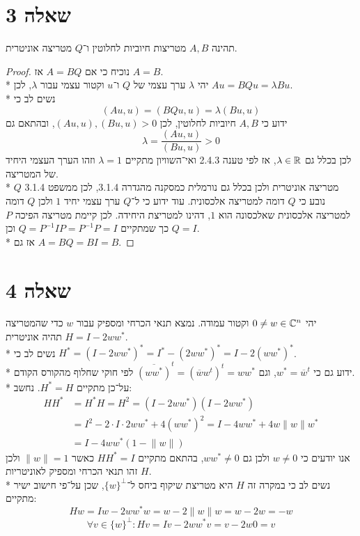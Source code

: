 \section{שאלה 3}
תהינה $A, B$ מטריצות חיוביות לחלוטין ו־$Q$ מטריצה אוניטרית.
\begin{proof}
	נוכיח כי אם $A = BQ$ אז $A = B$. \\*
	יהי $\lambda$ ערך עצמי של $Q$ ו־$u$ וקטור עצמי עבור $\lambda$, לכן $A u = B Q u = \lambda B u$. \\*
	נשים לב כי
	\[
		(A u, u) = (B Q u, u) = \lambda (B u, u)
	\]
	ידוע כי $A, B$ חיוביות לחלוטין, לכן $(Au, u), (Bu, u) > 0$, ובהתאם גם
	\[
		\lambda = \frac{(A u, u)}{(B u, u)} > 0
	\]
	לכן בכלל גם $\lambda \in \mathbb{R}$, אז לפי טענה 2.4.3 ואי־השוויון מתקיים $\lambda = 1$ וזהו הערך העצמי היחיד של המטריצה. \\*
	$Q$ מטריצה אוניטרית ולכן בכלל גם נורמלית כמסקנה מהגדרה 3.1.4, לכן ממשפט 3.1.4 נובע כי $Q$ דומה למטריצה אלכסונית.
	עוד ידוע כי ל־$Q$ ערך עצמי יחיד $1$ ולכן $Q$ דומה למטריצה אלכסונית שאלכסונה הוא $1$, דהינו למטריצת היחידה.
	לכן קיימת מטריצה הפיכה $P$ כך שמתקיים $Q = P^{-1} I P = P^{-1} P = I$ וכן $Q = I$. \\*
	אז גם $A = B Q = B I = B$.
\end{proof}

\section{שאלה 4}
יהי $0 \ne w \in \mathbb{C}^n$ וקטור עמודה. נמצא תנאי הכרחי ומספיק עבור $w$ כדי שהמטריצה $H = I - 2 w w^*$ תהיה אוניטרית. \\*
נשים לב כי $H^* = {(I - 2 ww^*)}^* = I^* - {(2ww^*)}^* = I - 2{(ww^*)}^*$. \\*
ידוע גם כי $w^* = \overline{w}^t$, וגם ${\overline{(w w^*)}}^t = {(\overline{w} w^t)}^t = w w^*$ לפי חוקי שחלוף מהקורס הקודם. \\*
על־כן מתקיים $H^* = H$. נחשב:
\begin{align*}
	H H^* & = H^* H = H^2 = (I - 2w w^*)(I - 2w w^*) \\
		  & = I^2 - 2 \cdot I \cdot 2w w^* + 4{(ww^*)}^2 = I - 4ww^* + 4w \lVert w \rVert w^* \\
		  & = I - 4 ww^* (1 - \lVert w \rVert)
\end{align*}
אנו יודעים כי $w \ne 0$ ולכן גם $ww^* \ne 0$, בהתאם מתקיים $H H^* = I$ כאשר $\lVert w \rVert = 1$ ולכן זהו תנאי הכרחי ומספיק לאוניטריות $H$. \\*
נשים לב כי במקרה זה $H$ היא מטריצת שיקוף ביחס ל־${\{ w \}}^\perp$, שכן על־פי חישוב ישיר מתקיים:
\[
	H w = I w - 2w w^* w = w - 2 \lVert w \rVert w = w - 2w = -w
\]
\[
	\forall v \in {\{ w \}}^\perp: H v = I v - 2 w w^* v = v - 2w 0 = v
\]

